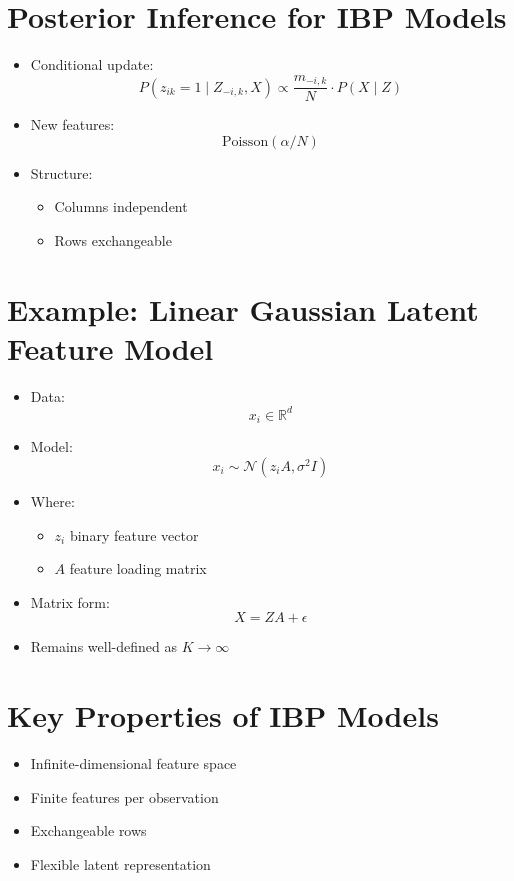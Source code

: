 \documentclass[12pt,oneside]{book}
\numberwithin{equation}{section}
\theoremstyle{definition}
\theoremstyle{plain}
\theoremstyle{remark}
\begin{document}
\section*{Posterior Inference for IBP Models}

\begin{itemize}
\item Conditional update:
\[
P(z_{ik}=1 \mid Z_{-i,k}, X)
\propto
\frac{m_{-i,k}}{N} \cdot P(X \mid Z)
\]

\item New features:
\[
\text{Poisson}(\alpha/N)
\]

\item Structure:
\begin{itemize}
\item Columns independent
\item Rows exchangeable
\end{itemize}
\end{itemize}

\section{Example: Linear Gaussian Latent Feature Model}

\begin{itemize}
\item Data:
\[
x_i \in \mathbb{R}^d
\]

\item Model:
\[
x_i \sim \mathcal{N}(z_i A, \sigma^2 I)
\]

\item Where:
\begin{itemize}
\item $z_i$ binary feature vector
\item $A$ feature loading matrix
\end{itemize}

\item Matrix form:
\[
X = ZA + \epsilon
\]

\item Remains well-defined as $K \to \infty$
\end{itemize}

\section*{Key Properties of IBP Models}

\begin{itemize}
\item Infinite-dimensional feature space
\item Finite features per observation
\item Exchangeable rows
\item Flexible latent representation
\end{itemize}
\end{document}

